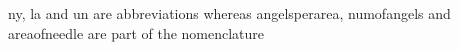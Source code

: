 \documentclass{article}
\begin{document}
\printacronyms[include-classes=abbrev,name=Abbreviations]

\printacronyms[include-classes=nomencl,name=Nomenclature]

\ac{ny}, \ac{la} and \ac{un} are abbreviations whereas
\ac{angelsperarea}, \ac{numofangels} and \ac{areaofneedle} are part of the
nomenclature
\end{document}
